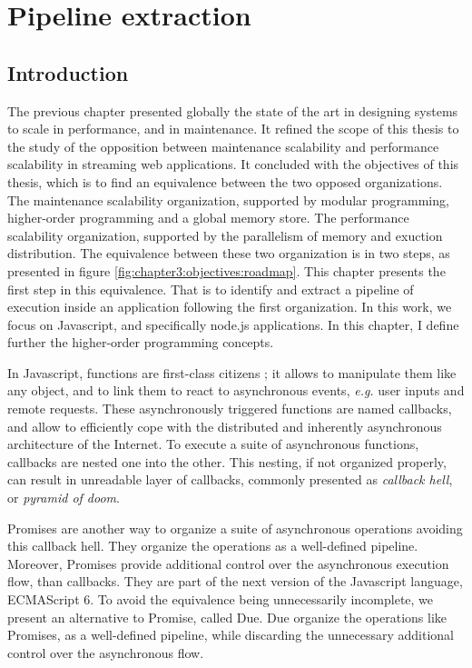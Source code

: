 \chapter{Pipeline extraction} \label{chapter4}

\section{Introduction}


The previous chapter presented globally the state of the art in designing systems to scale in performance, and in maintenance.
It refined the scope of this thesis to the study of the opposition between maintenance scalability and performance scalability in streaming web applications.
It concluded with the objectives of this thesis, which is to find an equivalence between the two opposed organizations.
The maintenance scalability organization, supported by modular programming, higher-order programming and a global memory store.
The performance scalability organization, supported by the parallelism of memory and exuction distribution.
The equivalence between these two organization is in two steps, as presented in figure \ref{fig:chapter3:objectives:roadmap}.
This chapter presents the first step in this equivalence.
That is to identify and extract a pipeline of execution inside an application following the first organization.
In this work, we focus on Javascript, and specifically node.js applications.
In this chapter, I define further the higher-order programming concepts.

In Javascript, functions are first-class citizens ; it allows to manipulate them like any object, and to link them to react to asynchronous events, \textit{e.g.} user inputs and remote requests.
These asynchronously triggered functions are named callbacks, and allow to efficiently cope with the distributed and inherently asynchronous architecture of the Internet.
To execute a suite of asynchronous functions, callbacks are nested one into the other.
This nesting, if not organized properly, can result in unreadable layer of callbacks, commonly presented as \textit{callback hell}, or \textit{pyramid of doom}.

Promises are another way to organize a suite of asynchronous operations avoiding this callback hell.
They organize the operations as a well-defined pipeline.
Moreover, Promises provide additional control over the asynchronous execution flow, than callbacks.
They are part of the next version of the Javascript language, ECMAScript 6.
To avoid the equivalence being unnecessarily incomplete, we present an alternative to Promise, called Due.
Due organize the operations like Promises, as a well-defined pipeline, while discarding the unnecessary additional control over the asynchronous flow.

